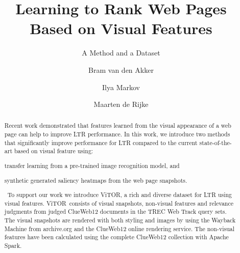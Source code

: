 \documentclass[sigconf,anonymous]{acmart}
\title{Learning to Rank Web Pages Based on Visual Features}
\subtitle{A Method and a Dataset}
\author{Bram van den Akker}
\affiliation{%
  \institution{University of Amsterdam}
  \city{Amsterdam} 
  \country{The Netherlands}
}
\author{Ilya Markov}
\affiliation{%
  \institution{University of Amsterdam}
  \city{Amsterdam} 
  \country{The Netherlands}  
}
\author{Maarten de Rijke}
\affiliation{%
   \institution{University of Amsterdam}
   \city{Amsterdam} 
   \country{The Netherlands}
}
\newcommand{\mdr}[1]{\textcolor{cyan}{#1}}
\newcommand{\datasetname}{\ac{ViTOR}}
\begin{document}
%
%
\begin{abstract}
Recent work demonstrated that features learned from the visual appearance of a web page can help to improve \ac{LTR} performance. 
In this work, we introduce two methods that significantly improve performance for \ac{LTR} compared to the current state-of-the-art based on visual feature using: 
\begin{inparaenum}[(i)]
\item transfer learning from a pre-trained image recognition model, and
\item synthetic generated saliency heatmaps from the web page snapshots.
\end{inparaenum}\ 
To support our work we introduce \datasetname, a rich and diverse dataset for \ac{LTR} using visual features. \datasetname~consists of visual snapshots, non-visual features and relevance judgments from judged ClueWeb12 documents in the TREC Web Track query sets. The visual snapshots are rendered with both styling and images by using the Wayback Machine from archive.org and the ClueWeb12 online rendering service. The non-visual features have been calculated using the complete ClueWeb12 collection with Apache Spark. 
\end{abstract}

%
%
\end{document}
